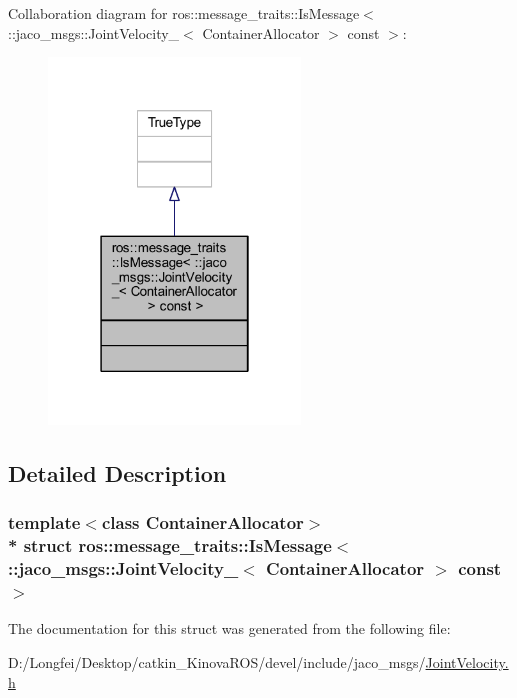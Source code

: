 Collaboration diagram for ros\+:\+:message\+\_\+traits\+:\+:Is\+Message$<$ \+:\+:jaco\+\_\+msgs\+:\+:Joint\+Velocity\+\_\+$<$ Container\+Allocator $>$ const $>$\+:
\nopagebreak
\begin{figure}[H]
\begin{center}
\leavevmode
\includegraphics[width=190pt]{d6/ddc/structros_1_1message__traits_1_1IsMessage_3_01_1_1jaco__msgs_1_1JointVelocity___3_01ContainerAll42512b7d1e0a0c307474317a8e8b1531}
\end{center}
\end{figure}


\subsection{Detailed Description}
\subsubsection*{template$<$class Container\+Allocator$>$\\*
struct ros\+::message\+\_\+traits\+::\+Is\+Message$<$ \+::jaco\+\_\+msgs\+::\+Joint\+Velocity\+\_\+$<$ Container\+Allocator $>$ const  $>$}



The documentation for this struct was generated from the following file\+:\begin{DoxyCompactItemize}
\item 
D\+:/\+Longfei/\+Desktop/catkin\+\_\+\+Kinova\+R\+O\+S/devel/include/jaco\+\_\+msgs/\hyperlink{JointVelocity_8h}{Joint\+Velocity.\+h}\end{DoxyCompactItemize}
